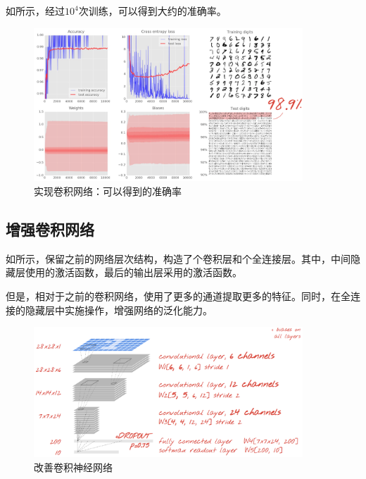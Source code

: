 \begin{content}
如所示，经过$10^4$次训练，可以得到大约的准确率。

\begin{figure}[H]
\centering
\includegraphics[width=0.9\textwidth]{figures/mnist-conv2d-1-result.png}
\caption{实现卷积网络：可以得到的准确率}
 \label{fig:mnist-conv2d-1-result}
\end{figure}

\subsection{增强卷积网络}

如所示，保留之前的网络层次结构，构造了个卷积层和个全连接层。其中，中间隐藏层使用的激活函数，最后的输出层采用的激活函数。

但是，相对于之前的卷积网络，使用了更多的通道提取更多的特征。同时，在全连接的隐藏层中实施操作，增强网络的泛化能力。

\begin{figure}[H]
\centering
\includegraphics[width=0.9\textwidth]{figures/mnist-conv2d-2.png}
\caption{改善卷积神经网络}
 \label{fig:mnist-conv2d-2}
\end{figure}


\end{content}

